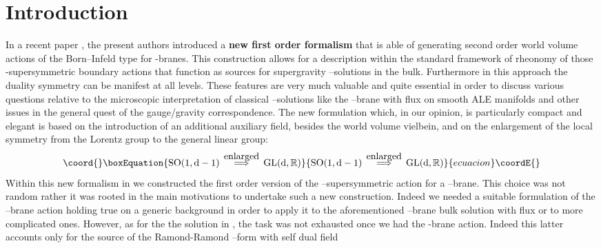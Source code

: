 \documentclass[a4paper,11pt]{article}
\begin{document}
\section{Introduction}
In a recent paper \cite{noidued3}, the present authors introduced
a \textbf{new first order formalism} that is able of generating second order world volume actions of
the Born--Infeld type for \coordHE{}-branes.
This construction allows for a description within the
standard framework of rheonomy of those \myHighlight{$\kappa$}\coordHE{}-supersymmetric boundary actions
that function as sources for  supergravity \coordHE{}--solutions in the bulk. Furthermore
in this approach the \coordHE{}
duality symmetry  can be manifest at all levels.
These features are very much valuable and quite essential in order
to discuss various questions relative to the microscopic
interpretation of classical \coordHE{}--solutions like the \coordHE{}--brane with flux on
smooth ALE manifolds \cite{noialtrilast} and other issues in the
general quest of the gauge/gravity correspondence.
The new formulation which, in our opinion, is
particularly compact and elegant is based on the introduction of an
additional auxiliary field, besides the world volume vielbein, and on
the enlargement of the local symmetry from the Lorentz group to the
general linear group:
\begin{equation}\coord{}\boxEquation{
  \mathrm{SO(1,d-1)}\,  \stackrel{\mbox{enlarged}}{\Longrightarrow}
  \, \mathrm{GL(d,\mathbb{R})}
\label{allargo}
}{
  \mathrm{SO(1,d-1)}\,  \stackrel{\mbox{enlarged}}{\Longrightarrow}
  \, \mathrm{GL(d,\mathbb{R})}
}{ecuacion}\coordE{}\end{equation}
Within this new formalism in \cite{noidued3} we constructed the first order
version of the \myHighlight{$\kappa$}\coordHE{}--supersymmetric action for
a \coordHE{}--brane. This choice was not random rather it was rooted in the main
motivations to undertake such a  new construction. Indeed we needed a
suitable formulation of the \coordHE{}--brane action holding true on a
generic background in order to apply it to the aforementioned
\coordHE{}--brane bulk solution with flux \cite{noialtrilast} or to more complicated ones.
However, as for the the solution in \cite{noialtrilast}, the task was not
exhausted once we had the \coordHE{}-brane action. Indeed this latter accounts
only  for the source of the  Ramond-Ramond \coordHE{}--form with self dual field
\end{document}
